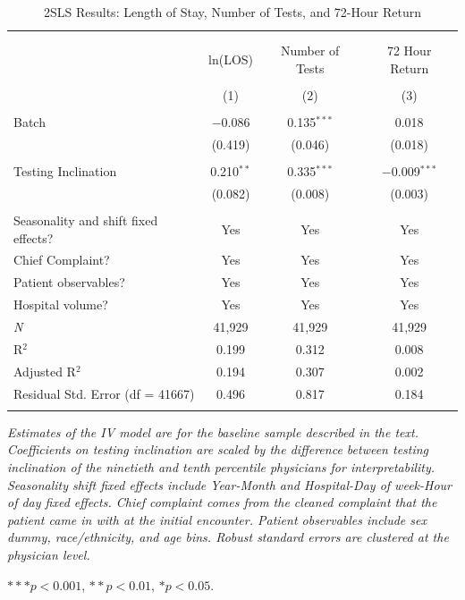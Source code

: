 \documentclass[,,nonblindrev]{informs}
\begin{document}
\begin{table}[!htbp] \centering 
  \caption{2SLS Results: Length of Stay, Number of Tests, and 72-Hour Return} 
  \label{tab:2SLS} 
\begin{tabular}{p{7cm}ccc}
\\[-1.8ex]\hline 
\hline \\[-1.8ex] 
\\[-1.8ex] & ln(LOS) & Number of Tests & 72 Hour Return \\ 
\\[-1.8ex] & (1) & (2) & (3)\\ 
\hline \\[-1.8ex] 
 Batch & $-$0.086 & 0.135$^{***}$ & 0.018 \\ 
  & (0.419) & (0.046) & (0.018) \\ 
  & & & \\ 
 Testing Inclination & 0.210$^{**}$ & 0.335$^{***}$ & $-$0.009$^{***}$ \\ 
  & (0.082) & (0.008) & (0.003) \\ 
  & & & \\ 
Seasonality and shift fixed effects? & Yes & Yes & Yes \\
Chief Complaint? & Yes & Yes & Yes \\
Patient observables? & Yes & Yes & Yes \\
Hospital volume? & Yes & Yes & Yes \\
\midrule
\textit{N} & 41,929 & 41,929 & 41,929 \\ 
R$^{2}$ & 0.199 & 0.312 & 0.008 \\ 
Adjusted R$^{2}$ & 0.194 & 0.307 & 0.002 \\ 
Residual Std. Error (df = 41667) & 0.496 & 0.817 & 0.184 \\ 
\\
\bottomrule
\end{tabular}
\begin{tablenotes}
\tiny
\item \textit{Estimates of the IV model are for the baseline sample described in the text. Coefficients on testing inclination are scaled by the difference between testing inclination of the ninetieth and tenth percentile physicians for interpretability. Seasonality shift fixed effects include Year-Month and Hospital-Day of week-Hour of day fixed effects. Chief complaint comes from the cleaned complaint that the patient came in with at the initial encounter. Patient observables include sex dummy, race/ethnicity, and age bins. Robust standard errors are clustered at the physician level.}
\item $*** p < 0.001$, $** p < 0.01$, $* p < 0.05$.
\end{tablenotes}
\end{table}
\end{document}
